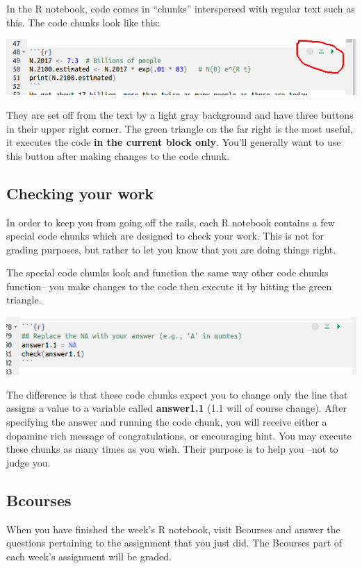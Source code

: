 \documentclass[11pt]{article}
\begin{document}
In the R notebook, code comes in ``chunks'' interspersed with regular text such as this.  The code chunks look like this:

\includegraphics[scale=.5]{RstudioChunk}

They are set off from the text by a light gray background and have three buttons in their upper right corner.  The green triangle on the far right is the most useful, it executes the code \textbf{in the current block only}. You'll generally want to use this button after making changes to the code chunk.

\subsection{Checking your work}

In order to keep you from going off the rails, each R notebook contains a few special code chunks which are designed to check your work. This is not for grading purposes, but rather to let you know that you are doing things right.

The special code chunks look and function the same way other code chunks function-- you make changes to the code then execute it by hitting the green triangle.

\includegraphics[scale=.5]{RstudioCheck}

The difference is that these code chunks expect you to change only the line that assigns a value to a variable called \textbf{answer1.1} (1.1 will of course change).  After specifying the answer and running the code chunk, you will receive either a dopamine rich message of congratulations, or encouraging hint.  You may execute these chunks as many times as you wish. Their purpose is to help you --not to judge you.

\subsection{Bcourses}

When you have finished the week's R notebook, visit Bcourses and answer the questions pertaining to the assignment that you just did.  The Bcourses part of each week's assignment will be graded.
\end{document}
